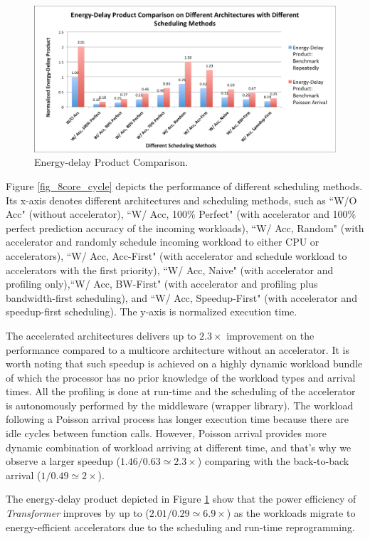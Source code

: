 \begin{figure}
    \centering
    \includegraphics[width=4.5in]{Energy-Delay-8core}
    \caption{Energy-delay Product Comparison.}
    \label{fig_8core_energy_delay}
\end{figure}

Figure \ref{fig_8core_cycle} depicts the performance of different
scheduling methods. Its x-axis denotes different
architectures and scheduling methods, such as ``W/O Acc" (without
accelerator), ``W/ Acc, 100\% Perfect" (with accelerator and 100\%
perfect prediction accuracy of the incoming workloads), ``W/ Acc,
Random" (with accelerator and randomly schedule incoming workload to
either CPU or accelerators), ``W/ Acc, Acc-First" (with accelerator
and schedule workload to accelerators with the first priority), ``W/
Acc, Naive" (with accelerator and profiling only),``W/ Acc, BW-First"
(with accelerator and profiling plus bandwidth-first scheduling), and
``W/ Acc, Speedup-First" (with accelerator and speedup-first
scheduling). The y-axis is normalized execution time.

The accelerated architectures delivers up to $2.3\times$ improvement on the performance
compared to a multicore architecture without an accelerator. It is
worth noting that such speedup is achieved on a highly dynamic
workload bundle of which the processor has no prior knowledge of the
workload types and arrival times. All the profiling is done at run-time and the
scheduling of the accelerator is autonomously performed by the
middleware (wrapper library). The workload following a Poisson arrival
process has longer execution time because there are idle cycles
between function calls. However, Poisson arrival provides more dynamic
combination of workload arriving at different time, and that's why we
observe a larger speedup ($1.46/0.63\simeq2.3\times$) comparing with the
back-to-back arrival ($1/0.49\simeq2\times$). 

The energy-delay product depicted in Figure
\ref{fig_8core_energy_delay} show that the power efficiency of {\em
 Transformer} improves by up to ($2.01/0.29\simeq6.9\times$) as the workloads migrate to
energy-efficient accelerators due to the scheduling and run-time
reprogramming.




